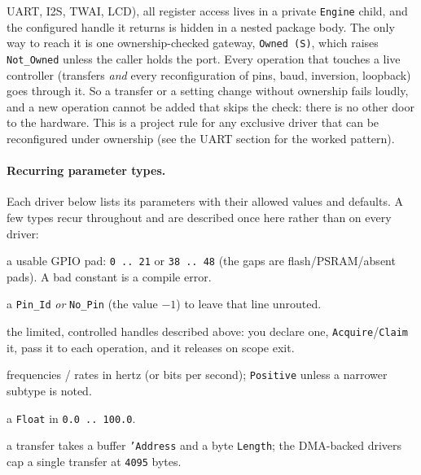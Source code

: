 \begin{description}[style=nextline]
  UART, I2S, TWAI, LCD), all register access lives in a private \texttt{Engine}
  child, and the configured handle it returns is hidden in a nested package body.
  The only way to reach it is one ownership-checked gateway, \texttt{Owned (S)},
  which raises \texttt{Not\_Owned} unless the caller holds the port. Every
  operation that touches a live controller (transfers \emph{and} every
  reconfiguration of pins, baud, inversion, loopback) goes through it. So a
  transfer or a setting change without ownership fails loudly, and a new
  operation cannot be added that skips the check: there is no other door to the
  hardware. This is a project rule for any exclusive driver that can be
  reconfigured under ownership (see the UART section for the worked pattern).
\end{description}

\paragraph{Recurring parameter types.} Each driver below lists its parameters
with their allowed values and defaults. A few types recur throughout and are
described once here rather than on every driver:
\begin{description}[style=nextline]
\item[\texttt{Pin\_Id}] a usable GPIO pad: \texttt{0\,..\,21} or
  \texttt{38\,..\,48} (the gaps are flash/PSRAM/absent pads). A bad constant is a
  compile error.
\item[\texttt{Optional\_Pin}] a \texttt{Pin\_Id} \emph{or} \texttt{No\_Pin} (the
  value $-1$) to leave that line unrouted.
\item[Ownership handles (\texttt{Session}, \texttt{Channel}, \texttt{Reader},
  \texttt{Unit}, \texttt{Timer})] the limited, controlled handles described above:
  you declare one, \texttt{Acquire}/\texttt{Claim} it, pass it to each operation,
  and it releases on scope exit.
\item[\texttt{...\_Hz}, \texttt{Freq}, \texttt{Baud}, \texttt{Bit\_Rate}]
  frequencies / rates in hertz (or bits per second); \texttt{Positive} unless a
  narrower subtype is noted.
\item[\texttt{...\_Percent}] a \texttt{Float} in \texttt{0.0\,..\,100.0}.
\item[Buffers] a transfer takes a buffer \texttt{'Address} and a byte
  \texttt{Length}; the DMA-backed drivers cap a single transfer at \texttt{4095}
  bytes.
\end{description}


